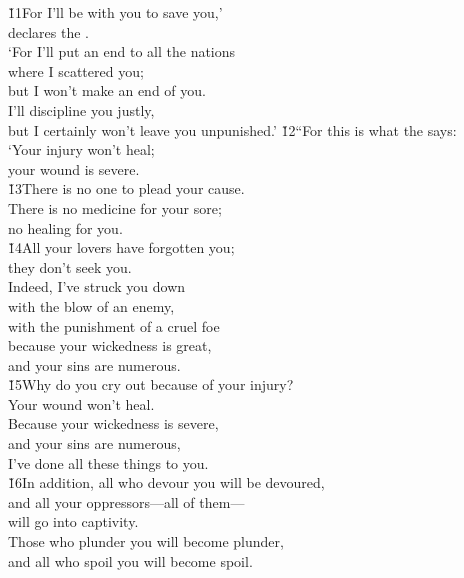 \begin{poetry}
\poeml \v{11}For I'll be with you to save you,' \\
\poemll    declares the . \\
\poeml `For I'll put an end to all the nations \\
\poemll    where I scattered you; \\
\poemlll       but I won't make an end of you. \\
\poeml I'll discipline you justly, \\
\poemll    but I certainly won't leave you unpunished.'
\poeml \v{12}``For this is what the  says: \\
\poeml `Your injury won't heal; \\
\poemll    your wound is severe. \\
\poeml \v{13}There is no one to plead your cause. \\
\poemll    There is no medicine for your sore; \\
\poemlll       no healing for you. \\
\poeml \v{14}All your lovers have forgotten you; \\
\poemll    they don't seek you. \\
\poeml Indeed, I've struck you down \\
\poemll    with the blow of an enemy, \\
\poemlll       with the punishment of a cruel foe \\
\poeml because your wickedness is great, \\
\poemll    and your sins are numerous. \\
\poeml \v{15}Why do you cry out because of your injury? \\
\poemll    Your wound won't heal. \\
\poeml Because your wickedness is severe, \\
\poemll    and your sins are numerous, \\
\poemlll       I've done all these things to you. \\
\poeml \v{16}In addition, all who devour you will be devoured, \\
\poemll    and all your oppressors---all of them--- \\
\poemlll       will go into captivity. \\
\poeml Those who plunder you will become plunder, \\
\poemll    and all who spoil you will become spoil. \\

\end{poetry}
